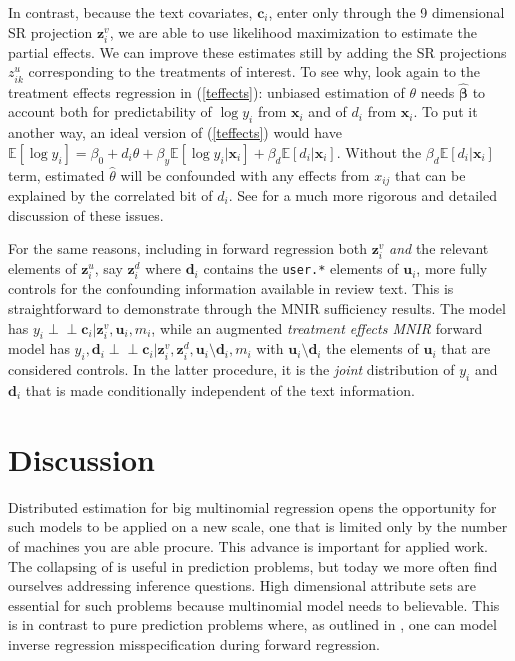 \documentclass[12pt]{article}
\newcommand{\bs}[1]{\boldsymbol{#1}}
\newcommand{\bm}[1]{\mathbf{#1}}
\newcommand{\ds}[1]{\mathds{#1}}
\newcommand{\indep}{\perp\!\!\!\perp}
\newcommand{\cd}[1]{{\tt#1}}
\begin{document}
In contrast, because the text covariates, $\bm{c}_i$, enter only through the 9
dimensional SR projection $\bm{z}^v_i$, we are able to use likelihood maximization
 to estimate the partial effects.
We can improve these estimates still by adding the SR
projections $z^u_{ik}$ corresponding to the treatments of interest.    To see why, look
again to the treatment effects regression in (\ref{teffects}): 
unbiased estimation of $\theta$ needs $\bs{\hat\beta}$ to account both for
predictability of $\log y_i$ from $\bm{x}_i$ and of $d_i$ from $\bm{x}_i$.  To
put it another way, an ideal version of (\ref{teffects}) would have $\ds{E}[\log y_i] = \beta_0 + d_i\theta  + \beta_y \ds{E}[\log y_i
| \bm{x}_i] + \beta_d \ds{E}[d_i | \bm{x}_i]$.  Without the $\beta_d \ds{E}[d_i | \bm{x}_i]$ 
term, estimated $\hat\theta$ will be confounded with any effects from
$x_{ij}$ that can be explained by the correlated bit of $d_i$.  See
\citet{belloni_inference_2012} for a much more rigorous and detailed
discussion of these issues.

For the same reasons, including in forward regression both $\bm{z}_i^v$ {\it
and} the relevant elements of $\bm{z}_i^u$, say $\bm{z}_i^d$ where $\bm{d}_i$
contains the \cd{user.*} elements of $\bm{u}_i$, more fully controls for the
confounding information available in review text. This is straightforward to
demonstrate through the MNIR sufficiency results.  The model  has $y_i \indep
\bm{c}_i | \bm{z}^v_i, \bm{u}_i, m_i$, while an augmented {\it treatment
effects MNIR} forward model has $y_i, \bm{d}_i \indep
\bm{c}_i | \bm{z}^v_i,\bm{z}^d_i, \bm{u}_i\!\setminus\!\bm{d}_i, m_i$ with
$\bm{u}_i\!\setminus\!\bm{d}_i$ the  elements of $\bm{u}_i$ that are
considered controls. In the latter procedure, it is  the {\it joint}
distribution of $y_i$ and $\bm{d}_i$ that is made conditionally independent of
the text information.

\section{Discussion}
\label{END}

Distributed estimation for big multinomial regression opens the opportunity
for such models to be applied on a new  scale, one that is limited only by the
number of machines you are able procure. This advance is important for applied
work.  The collapsing of
\cite{taddy_multinomial_2013} is useful in prediction problems, but today
we more often find ourselves addressing inference questions.  High dimensional
attribute sets are essential for such problems because multinomial model needs
to believable. This is in contrast to pure prediction problems where, as
outlined in \cite{taddy_rejoinder:_2013}, one can model inverse regression
misspecification during forward regression.
\end{document}
